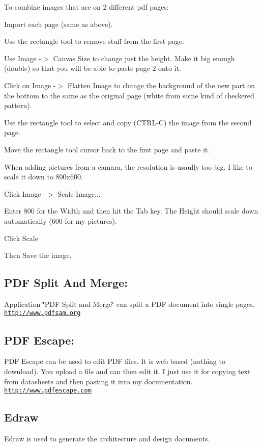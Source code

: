 To combine images that are on 2 different pdf pages\-:
\begin{DoxyItemize}
\item Import each page (same as above).
\item Use the rectangle tool to remove stuff from the first page.
\item Use Image -\/$>$ Canvas Size to change just the height. Make it big enough (double) so that you will be able to paste page 2 onto it.
\item Click on Image -\/$>$ Flatten Image to change the background of the new part on the bottom to the same as the original page (white from some kind of checkered pattern).
\item Use the rectangle tool to select and copy (C\-T\-R\-L-\/\-C) the image from the second page.
\item Move the rectangle tool cursor back to the first page and paste it.
\end{DoxyItemize}

When adding pictures from a camara, the resolution is usaully too big. I like to scale it down to 800x600.
\begin{DoxyItemize}
\item Click Image -\/$>$ Scale Image...
\item Enter 800 for the Width and then hit the Tab key. The Height should scale down automatically (600 for my pictures).
\item Click Scale
\item Then Save the image.
\end{DoxyItemize}\hypertarget{index_PDFS}{}\subsection{P\-D\-F Split And Merge\-:}\label{index_PDFS}
Application \char`\"{}\-P\-D\-F Split and Merge\char`\"{} can split a P\-D\-F document into single pages. \href{http://www.pdfsam.org}{\tt http\-://www.\-pdfsam.\-org}\hypertarget{index_PDFE}{}\subsection{P\-D\-F Escape\-:}\label{index_PDFE}
P\-D\-F Escape can be used to edit P\-D\-F files. It is web based (nothing to download). You upload a file and can then edit it. I just use it for copying text from datasheets and then pasting it into my documentation. \href{http://www.pdfescape.com}{\tt http\-://www.\-pdfescape.\-com}\hypertarget{index_Edraw}{}\subsection{Edraw}\label{index_Edraw}
Edraw is used to generate the architecture and design documents.

